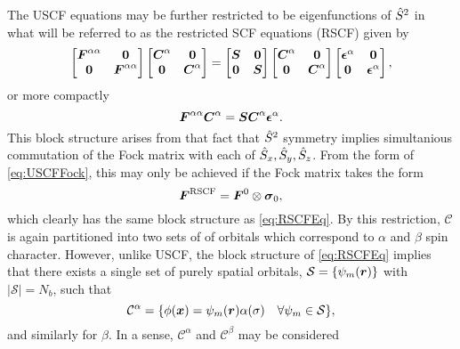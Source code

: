 The USCF equations may be further restricted to be eigenfunctions of $\hat{S}^2$ in what will be referred to as
the restricted SCF equations (RSCF) given by
\begin{equation}
  \label{eq:RSCFEq}
  \begin{bmatrix}
    \boldsymbol{F}^{\alpha\alpha} & \boldsymbol{0} \\ \boldsymbol{0} & \boldsymbol{F}^{\alpha\alpha}
  \end{bmatrix}
  \begin{bmatrix}
    \boldsymbol{C}^{\alpha} & \boldsymbol{0} \\ \boldsymbol{0} & \boldsymbol{C}^{\alpha}
  \end{bmatrix}
  =
  \begin{bmatrix}
    \boldsymbol{S} & \boldsymbol{0} \\ \boldsymbol{0} & \boldsymbol{S}
  \end{bmatrix}
  \begin{bmatrix}
    \boldsymbol{C}^{\alpha} & \boldsymbol{0} \\ \boldsymbol{0} & \boldsymbol{C}^{\alpha}
  \end{bmatrix}
  \begin{bmatrix}
    \boldsymbol{\epsilon}^{\alpha} & \boldsymbol{0} \\ \boldsymbol{0} & \boldsymbol{\epsilon}^{\alpha}
  \end{bmatrix},
\end{equation}
or more compactly 
\begin{equation}
\boldsymbol{F}^{\alpha\alpha} \boldsymbol{C}^\alpha = \boldsymbol{S} \boldsymbol{C}^\alpha \boldsymbol{\epsilon}^\alpha.
\end{equation}
This block structure arises from that fact that $\hat{S}^2$ symmetry implies simultanious
commutation of the Fock matrix with each of $\hat{S}_x, \hat{S}_y, \hat{S}_z$. From the
form of \cref{eq:USCFFock}, this may only be achieved if the Fock matrix takes the form
\begin{equation}
\boldsymbol{F}^\mathrm{RSCF} = \boldsymbol{F}^0 \otimes \boldsymbol{\sigma}_{0},
\end{equation}
which clearly has the same block structure as \cref{eq:RSCFEq}. By this restriction,
$\mathcal C$ is again partitioned into two sets of of orbitals which correspond to
$\alpha$ and $\beta$ spin character. However, unlike USCF, the block structure of 
\cref{eq:RSCFEq} implies that there exists a single set of purely spatial
orbitals, $\mathcal S = \{ \psi_m(\boldsymbol{r}) \}$ with $\vert \mathcal S \vert = N_b$, such that
\begin{equation}
  \mathcal C^\alpha = \{ \phi(\boldsymbol{x}) = \psi_m(\boldsymbol{r}) \alpha(\sigma) \quad \forall \psi_m \in \mathcal S \},
\end{equation}
and similarly for $\beta$. In a sense, $\mathcal C^\alpha$ and $\mathcal C^\beta$ may be considered
